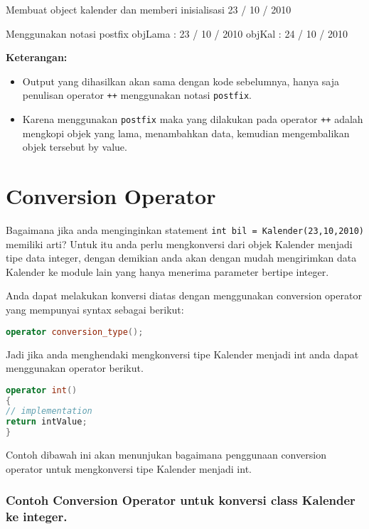 \begin{lcverbatim}
Membuat object kalender dan memberi inisialisasi
23 / 10 / 2010

Menggunakan notasi postfix
objLama : 23 / 10 / 2010
objKal : 24 / 10 / 2010
\end{lcverbatim}

\textbf{Keterangan:}

\begin{itemize}
\tightlist
\item
  Output yang dihasilkan akan sama dengan kode sebelumnya, hanya saja
  penulisan operator \texttt{++} menggunakan notasi \texttt{postfix}.
\item
  Karena menggunakan \texttt{postfix} maka yang dilakukan pada operator
  \texttt{++} adalah mengkopi objek yang lama, menambahkan data,
  kemudian mengembalikan objek tersebut by value.
\end{itemize}

\section{Conversion Operator}\label{conversion-operator}

Bagaimana jika anda menginginkan statement
\texttt{int\ bil\ =\ Kalender(23,10,2010)} memiliki arti? Untuk itu anda
perlu mengkonversi dari objek Kalender menjadi tipe data integer, dengan
demikian anda akan dengan mudah mengirimkan data Kalender ke module lain
yang hanya menerima parameter bertipe integer.

Anda dapat melakukan konversi diatas dengan menggunakan conversion
operator yang mempunyai syntax sebagai berikut:

\begin{lstlisting}[language=c++, numbers=none]
operator conversion_type();
\end{lstlisting}

Jadi jika anda menghendaki mengkonversi tipe Kalender menjadi int anda
dapat menggunakan operator berikut.

\begin{lstlisting}[language=c++, numbers=none]
operator int()
{
// implementation
return intValue;
}
\end{lstlisting}

Contoh dibawah ini akan menunjukan bagaimana penggunaan conversion
operator untuk mengkonversi tipe Kalender menjadi int.

\subsubsection*{Contoh Conversion Operator untuk konversi class Kalender ke integer.}

